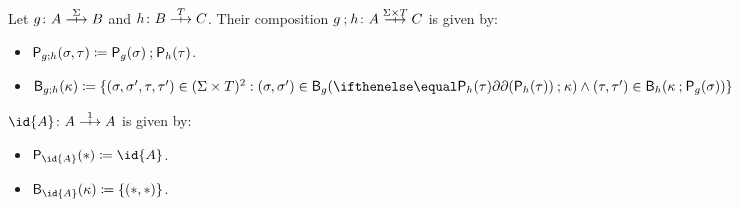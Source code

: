 \begin{definition}
  Let \(g \colon A \gamearrow{\Sigma} B\) and \(h \colon B \gamearrow{T} C\).
  Their composition \(g \dcomp h \colon A \gamearrow{\Sigma \times T} C\) is given by:
  \begin{itemize}
    \item \(\mathsf{P}_{g \mathbin{;} h}(\sigma, \tau) \coloneqq \mathsf{P}_{g}(\sigma) \mathbin{;} \mathsf{P}_{h}(\tau)\).
    \item \(\best{g \dcomp h}(\kappa) \defn \{(\sigma,\sigma',\tau,\tau') \in (\Sigma \times T)^2 : (\sigma, \sigma') \in \best{g}(\delay[\play{h}(\tau)] \dcomp \kappa) \land (\tau, \tau') \in \best{h}(\kappa \dcomp \play{g}(\sigma))\}\)
  \end{itemize}
  \(\id{A} \colon A \gamearrow{1} A\) is given by:
  \begin{itemize}
    \item \(\play{\id{A}}(\ast) \defn \id{A}\).
    \item \(\best{\id{A}}(\kappa) \defn \{(\ast, \ast)\}\).
  \end{itemize}
\end{definition}
